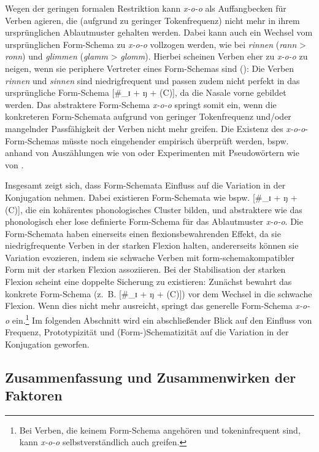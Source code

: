 Wegen der geringen formalen Restriktion kann \textit{x-o-o} als Auffangbecken für Verben agieren, die (aufgrund zu geringer Tokenfrequenz) nicht mehr in ihrem ursprünglichen Ablautmuster gehalten werden. Dabei kann auch ein Wechsel vom ursprünglichen Form-Schema zu \textit{x-o-o} vollzogen werden, wie bei \textit{rinnen} (\textit{rann} > \textit{ronn}) und \textit{glimmen} (\textit{glamm} > \textit{glomm}).  Hierbei scheinen Verben eher zu \textit{x-o-o} zu neigen, wenn sie periphere Vertreter eines Form-Schemas sind (\cite[435]{Nowak.2010}): Die Verben \textit{rinnen} und \textit{sinnen} sind niedrigfrequent und passen zudem nicht perfekt in das ursprüngliche Form-Schema [\#\_ɪ + ŋ + (C)], da die Nasale vorne gebildet werden. Das abstraktere Form-Schema \textit{x-o-o} springt somit ein, wenn die konkreteren Form-Schemata aufgrund von geringer Tokenfrequenz und/oder mangelnder Passfähigkeit der Verben nicht mehr greifen. Die Existenz des \textit{x-o-o}-Form-Schemas müsste noch eingehender empirisch überprüft werden, bspw. anhand von Auszählungen wie von \textcite{Kopcke.1999} oder Experimenten mit Pseudowörtern wie von \textcite{Bybee.1983}. 

Insgesamt zeigt sich, dass Form-Schemata Einfluss auf die Variation in der Konjugation nehmen. Dabei existieren Form-Schemata wie bspw. [\#\_ɪ + ŋ + (C)], die ein kohärentes phonologisches Cluster bilden, und abstraktere wie das phonologisch eher lose definierte Form-Schema für das Ablautmuster \textit{x-o-o}.  Die Form-Schemata haben einerseits einen flexionsbewahrenden Effekt, da sie niedrigfrequente Verben in der starken Flexion halten, andererseits können sie Variation evozieren, indem sie schwache Verben mit form-schemakompatibler Form mit der starken Flexion assoziieren. Bei der Stabilisation der starken Flexion scheint eine doppelte Sicherung zu existieren: Zunächst bewahrt das konkrete Form-Schema (z.~B. [\#\_ɪ + ŋ + (C)]) vor dem Wechsel in die schwache Flexion. Wenn dies nicht mehr ausreicht, springt das generelle Form-Schema \textit{x-o-o} ein.\footnote{Bei Verben, die keinem Form-Schema angehören und tokeninfrequent sind, kann \textit{x-o-o} selbstverständlich auch greifen.} Im folgenden Abschnitt wird ein abschließender Blick auf den Einfluss von Frequenz, Prototypizität und (Form-)Schematizität auf die Variation in der Konjugation geworfen.   

\subsection{Zusammenfassung und Zusammenwirken der Faktoren} 
\label{zusverb}

